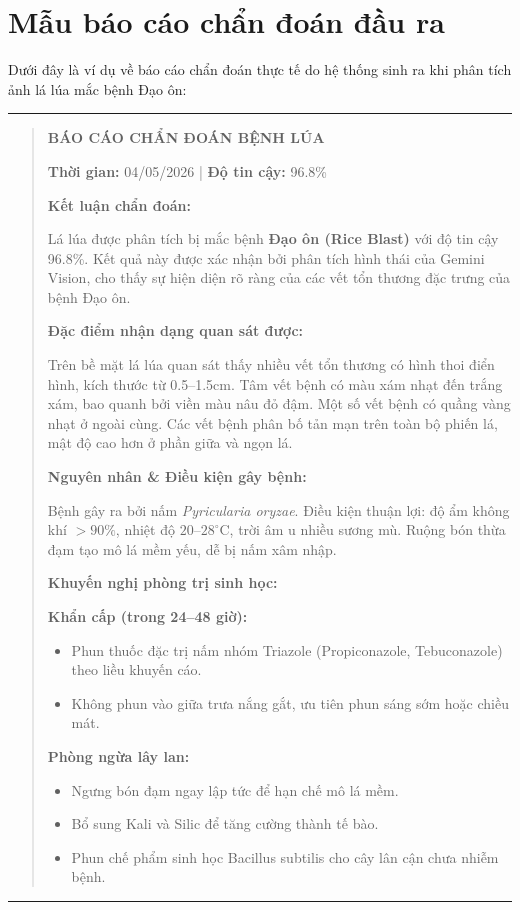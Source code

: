 \documentclass[13pt,a4paper]{extreport}
\begin{document}
\chapter{Mẫu báo cáo chẩn đoán đầu ra}

Dưới đây là ví dụ về báo cáo chẩn đoán thực tế do hệ thống sinh ra khi phân tích ảnh lá lúa mắc bệnh Đạo ôn:

\vspace{0.5cm}
\noindent\rule{\textwidth}{0.8pt}
\begin{quote}
\textbf{\large BÁO CÁO CHẨN ĐOÁN BỆNH LÚA}

\textbf{Thời gian:} 04/05/2026 | \textbf{Độ tin cậy:} 96.8\%

\bigskip
\noindent\textbf{Kết luận chẩn đoán:}

Lá lúa được phân tích bị mắc bệnh \textbf{Đạo ôn (Rice Blast)} với độ tin cậy 96.8\%. Kết quả này được xác nhận bởi phân tích hình thái của Gemini Vision, cho thấy sự hiện diện rõ ràng của các vết tổn thương đặc trưng của bệnh Đạo ôn.

\bigskip
\noindent\textbf{Đặc điểm nhận dạng quan sát được:}

Trên bề mặt lá lúa quan sát thấy nhiều vết tổn thương có hình thoi điển hình, kích thước từ 0.5--1.5cm. Tâm vết bệnh có màu xám nhạt đến trắng xám, bao quanh bởi viền màu nâu đỏ đậm. Một số vết bệnh có quầng vàng nhạt ở ngoài cùng. Các vết bệnh phân bố tản mạn trên toàn bộ phiến lá, mật độ cao hơn ở phần giữa và ngọn lá.

\bigskip
\noindent\textbf{Nguyên nhân \& Điều kiện gây bệnh:}

Bệnh gây ra bởi nấm \textit{Pyricularia oryzae}. Điều kiện thuận lợi: độ ẩm không khí $>90\%$, nhiệt độ $20$--$28^\circ$C, trời âm u nhiều sương mù. Ruộng bón thừa đạm tạo mô lá mềm yếu, dễ bị nấm xâm nhập.

\bigskip
\noindent\textbf{Khuyến nghị phòng trị sinh học:}

\textbf{Khẩn cấp (trong 24--48 giờ):}
\begin{itemize}
    \item Phun thuốc đặc trị nấm nhóm Triazole (Propiconazole, Tebuconazole) theo liều khuyến cáo.
    \item Không phun vào giữa trưa nắng gắt, ưu tiên phun sáng sớm hoặc chiều mát.
\end{itemize}

\textbf{Phòng ngừa lây lan:}
\begin{itemize}
    \item Ngưng bón đạm ngay lập tức để hạn chế mô lá mềm.
    \item Bổ sung Kali và Silic để tăng cường thành tế bào.
    \item Phun chế phẩm sinh học Bacillus subtilis cho cây lân cận chưa nhiễm bệnh.
\end{itemize}
\end{quote}
\noindent\rule{\textwidth}{0.8pt}
\end{document}
